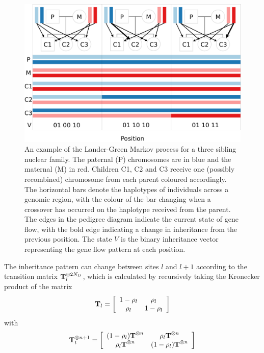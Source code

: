 \begin{figure}
  \begin{center} 
    \includegraphics[width=\textwidth]{chap3figs/nuclear_family}
    \caption[The Lander-Green haplotype model]{An example of the Lander-Green Markov process for a three sibling nuclear family.  The paternal (P) chromosomes are in blue and the maternal (M) in red.  Children C1, C2 and C3 receive one (possibly recombined) chromosome from each parent coloured accordingly. The horizontal bars denote the haplotypes of individuals across a genomic region, with the colour of the bar changing when a crossover has occurred on the haplotype received from the parent. The edges in the pedigree diagram indicate the current state of gene flow, with the bold edge indicating a change in inheritance from the previous position. The state $V$ is the binary inheritance vector representing the gene flow pattern at each position.  \label{chap3:landergreen}}
  \end{center} 
\end{figure}
  
\clearpage
The inheritance pattern can change between sites $l$ and $l+1$ according to the transition  matrix $\textrm{\textbf{T}}_l^{\otimes 2N_D}$, which is calculated by recursively taking the Kronecker product of the matrix
\[ \textrm{\textbf{T}}_l  = \left[
  \begin{array}{c c}
1 - \rho_l &   \rho_l \\
 \rho_l & 1 - \rho_l  \\
  \end{array}  
\right] \]
with
\[ \textrm{\textbf{T}}_l^{\otimes n + 1}  = \left[
  \begin{array}{c c}
    (1 - \rho_l)\textrm{\textbf{T}}^{\otimes n} &  \rho_l\textrm{\textbf{T}}^{\otimes n} \\
    \rho_l\textrm{\textbf{T}}^{\otimes n} & (1 - \rho_l)\textrm{\textbf{T}}^{\otimes n}  \\
  \end{array}  
\right] \]

